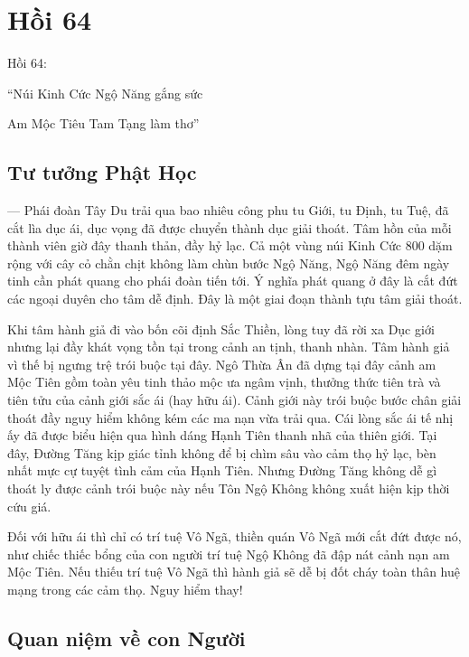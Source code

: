 \chapter{Hồi 64} %
\label{cha:hoi_64}

Hồi 64:

\begin{itshape}
``Núi Kinh Cức Ngộ Năng gắng sức

Am Mộc Tiêu Tam Tạng làm thơ''
\end{itshape}

\section{Tư tưởng Phật Học} %
\label{sec:64_phat_hoc}

— Phái đoàn Tây Du trải qua bao nhiêu công phu tu Giới, tu Định, tu Tuệ, đã cắt lìa dục ái, dục vọng đã được chuyển thành dục giải thoát. Tâm hồn của mỗi thành viên giờ đây thanh thản, đầy hỷ lạc. Cả một vùng núi Kinh Cức 800 dặm rộng với cây cỏ chằn chịt không làm chùn bước Ngộ Năng, Ngộ Năng đêm ngày tinh cần phát quang cho phái đoàn tiến tới. Ý nghĩa phát quang ở đây là cắt đứt các ngoại duyên cho tâm dễ định. Đây là một giai đoạn thành tựu tâm giải thoát.

Khi tâm hành giả đi vào bốn cõi định Sắc Thiền, lòng tuy đã rời xa Dục giới nhưng lại đầy khát vọng tồn tại trong cảnh an tịnh, thanh nhàn. Tâm hành giả vì thế bị ngưng trệ trói buộc tại đây. Ngô Thừa Ân đã dựng tại đây cảnh am Mộc Tiên gồm toàn yêu tinh thảo mộc ưa ngâm vịnh, thưởng thức tiên trà và tiên tửu của cảnh giới sắc ái (hay hữu ái). Cảnh giới này trói buộc bước chân giải thoát đầy nguy hiểm không kém các ma nạn vừa trải qua. Cái lòng sắc ái tế nhị ấy đã được biểu hiện qua hình dáng Hạnh Tiên thanh nhã của thiên giới. Tại đây, Đường Tăng kịp giác tỉnh không để bị chìm sâu vào cảm thọ hỷ lạc, bèn nhất mực cự tuyệt tình cảm của Hạnh Tiên. Nhưng Đường Tăng không dễ gì thoát ly được cảnh trói buộc này nếu Tôn Ngộ Không không xuất hiện kịp thời cứu giá.

Đối với hữu ái thì chỉ có trí tuệ Vô Ngã, thiền quán Vô Ngã mới cắt đứt được nó, như chiếc thiếc bổng của con người trí tuệ Ngộ Không đã đập nát cảnh nạn am Mộc Tiên. Nếu thiếu trí tuệ Vô Ngã thì hành giả sẽ dễ bị đốt cháy toàn thân huệ mạng trong các cảm thọ. Nguy hiểm thay!

\section{Quan niệm về con Người} %
\label{sec:64_con_nguoi}

